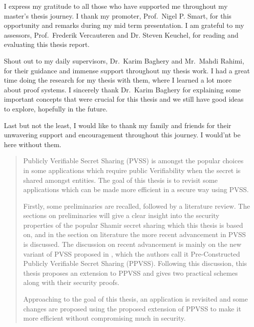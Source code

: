\documentclass[master=mcs]{kulemt}
\begin{document}
\begin{preface}
  I express my gratitude to all those who have supported me throughout my master's thesis 
  journey. I thank my promoter, Prof.\ Nigel P. Smart, for this opportunity and remarks 
  during my mid term presentation. I am grateful to my assessors, Prof.\ Frederik Vercauteren and 
  Dr. Steven Keuchel, for reading and evaluating this thesis report.\par

  Shout out to my daily supervisors, Dr.\ Karim Baghery and Mr.\ Mahdi Rahimi, for their 
  guidance and immense support throughout my thesis work. I had a great time doing the research 
  for my thesis with them, where I learned a lot more about proof systems. I sincerely 
  thank Dr.\ Karim Baghery for explaining some important concepts that were crucial 
  for this thesis and we still have good ideas to explore, hopefully in the future.\par

  Last but not the least, I would like to thank my family and friends for their
  unwavering support and encouragement throughout this journey. I would'nt be here without them.
\end{preface}

\tableofcontents*

\begin{abstract}
  Publicly Verifiable Secret Sharing (PVSS) is amongst the popular choices in some applications 
  which require public Verifiability when the secret is shared amongst entities. The goal 
  of this thesis is to revisit some applications which can be made more efficient in a 
  secure way using PVSS.\par
  
  Firstly, some preliminaries are recalled, followed by a literature review. The 
  sections on preliminaries will give a clear insight into the security properties of 
  the popular Shamir secret sharing which this thesis is based on, and in the section 
  on literature the more recent 
  advancement in PVSS is discussed. The discussion on recent advancement is mainly on 
  the new variant of PVSS proposed in \cite{cryptoeprint:2025/576}, which the authors 
  call it Pre-Constructed Publicly Verifiable Secret Sharing (PPVSS). Following this 
  discussion, this thesis proposes an extension to PPVSS and gives two practical schemes 
  along with their security proofs.\par

  Approaching to the goal of this thesis, an application is revisited and some changes are proposed 
  using the proposed extension of PPVSS to make it more efficient without 
  compromising much in security.\par
\end{abstract}
\end{document}
